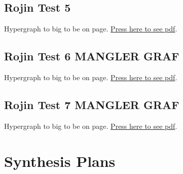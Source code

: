 \documentclass[a4paper,10pt,titlepage]{paper}
\begin{document}
\subsection{Rojin Test 5}
\begin{flushleft}
Hypergraph to big to be on page. \href{RojinGrafer/test5.pdf}{Press here to see pdf}.
\end{flushleft}
\label{Appendix::Rojin5}

\subsection{Rojin Test 6 MANGLER GRAF}
\begin{flushleft}
Hypergraph to big to be on page. \href{RojinGrafer/test5.pdf}{Press here to see pdf}.
\end{flushleft}
\label{Appendix::Rojin6}

\subsection{Rojin Test 7 MANGLER GRAF}
\begin{flushleft}
Hypergraph to big to be on page. \href{RojinGrafer/test5.pdf}{Press here to see pdf}.
\end{flushleft}
\label{Appendix::Rojin7}

\section{Synthesis Plans}
\end{document}
